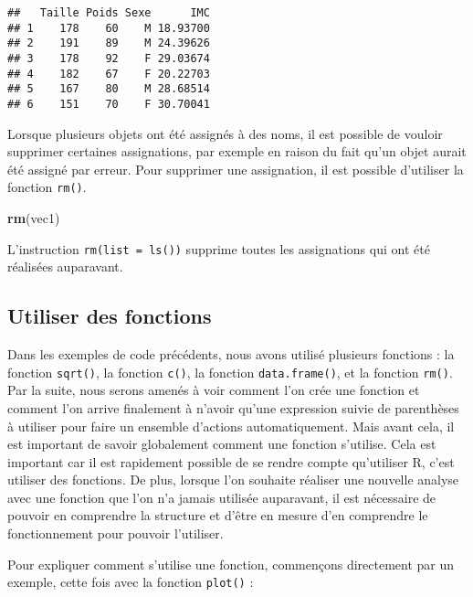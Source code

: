 \documentclass[
  french,
]{book}
\newenvironment{Shaded}{\begin{snugshade}}{\end{snugshade}}
\newcommand{\DataTypeTok}[1]{\textcolor[rgb]{0.13,0.29,0.53}{#1}}
\newcommand{\KeywordTok}[1]{\textcolor[rgb]{0.13,0.29,0.53}{\textbf{#1}}}
\newcommand{\NormalTok}[1]{#1}
\newcommand{\OperatorTok}[1]{\textcolor[rgb]{0.81,0.36,0.00}{\textbf{#1}}}
\begin{document}
\begin{verbatim}
##   Taille Poids Sexe      IMC
## 1    178    60    M 18.93700
## 2    191    89    M 24.39626
## 3    178    92    F 29.03674
## 4    182    67    F 20.22703
## 5    167    80    M 28.68514
## 6    151    70    F 30.70041
\end{verbatim}

Lorsque plusieurs objets ont été assignés à des noms, il est possible de vouloir supprimer certaines assignations, par exemple en raison du fait qu'un objet aurait été assigné par erreur. Pour supprimer une assignation, il est possible d'utiliser la fonction \texttt{rm()}.

\begin{Shaded}
\begin{Highlighting}[]
\KeywordTok{rm}\NormalTok{(vec1)}
\end{Highlighting}
\end{Shaded}

L'instruction \texttt{rm(list\ =\ ls())} supprime toutes les assignations qui ont été réalisées auparavant.

\hypertarget{utiliser-des-fonctions}{%
\subsection{Utiliser des fonctions}\label{utiliser-des-fonctions}}

Dans les exemples de code précédents, nous avons utilisé plusieurs fonctions : la fonction \texttt{sqrt()}, la fonction \texttt{c()}, la fonction \texttt{data.frame()}, et la fonction \texttt{rm()}. Par la suite, nous serons amenés à voir comment l'on crée une fonction et comment l'on arrive finalement à n'avoir qu'une expression suivie de parenthèses à utiliser pour faire un ensemble d'actions automatiquement. Mais avant cela, il est important de savoir globalement comment une fonction s'utilise. Cela est important car il est rapidement possible de se rendre compte qu'utiliser R, c'est utiliser des fonctions. De plus, lorsque l'on souhaite réaliser une nouvelle analyse avec une fonction que l'on n'a jamais utilisée auparavant, il est nécessaire de pouvoir en comprendre la structure et d'être en mesure d'en comprendre le fonctionnement pour pouvoir l'utiliser.

Pour expliquer comment s'utilise une fonction, commençons directement par un exemple, cette fois avec la fonction \texttt{plot()} :

\begin{Shaded}
\end{Shaded}
\end{document}
